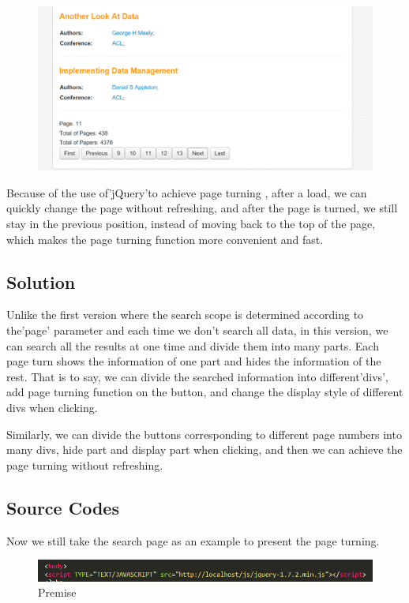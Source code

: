 \documentclass{book}
\begin{document}
\begin{figure}[H]
\centering
\includegraphics[scale=0.25]{img/dsw_1.png}

\end{figure}



Because of the use of'jQuery'to achieve page turning , after a load, we can quickly change the page without refreshing, and after the page is turned, we still stay in the previous position, instead of moving back to the top of the page, which makes the page turning function more convenient and fast.

\subsection{Solution}

Unlike the first version where the search scope is determined according to the'page' parameter and each time we don't search all data, in this version, we can search all the results at one time and divide them into many parts. Each page turn shows the information of one part and hides the information of the rest. That is to say, we can divide the searched information into different'divs', add page turning function on the button, and change the display style of different divs when clicking.

Similarly, we can divide the buttons corresponding to different page numbers into many divs, hide part and display part when clicking, and then we can achieve the page turning without refreshing.


\subsection{Source Codes}
Now we still take the search page as an example to present the page turning.

\begin{figure}[H]
\centering
\includegraphics[scale = 0.35]{img/dsw_2.png}
\caption{Premise}
\end{figure}
\end{document}
